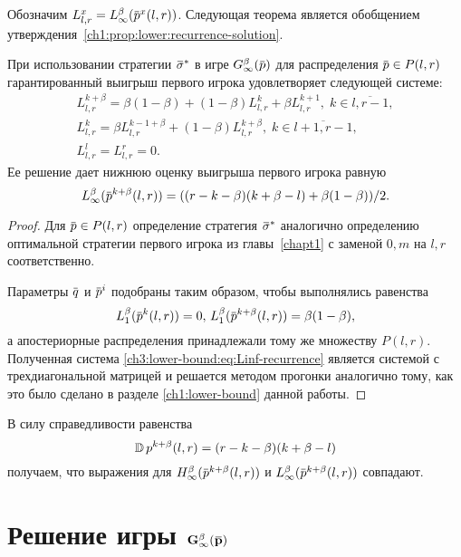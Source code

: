 {Обозначим $L^x_{l,r} = \Low(\p^x(l,r))$.
Следующая теорема является обобщением утверждения~\ref{ch1:prop:lower:recurrence-solution}.
\begin{theorem}
  \label{lower-bound:theorem}
  При использовании стратегии $\sigmav^*$ в игре $\theG[\infty](\p)$ для распределения $\p \in P(l,r)$ гарантированный выигрыш первого игрока удовлетворяет следующей системе:
  \begin{equation}
    \label{ch3:lower-bound:eq:Linf-recurrence}
    \begin{gathered}
      L^{k+\beta}_{l,r} =
      \beta(1-\beta) + (1-\beta) L^k_{l,r} + \beta L^{k+1}_{l,r}, \;
      k \in \overline{l, r - 1}, \\
      L^k_{l,r} =
      \beta L^{k-1+\beta}_{l,r} + (1-\beta) L^{k+\beta}_{l,r}, \;
      k \in \overline{l + 1, r - 1},\\
      L^l_{l,r} = L^r_{l,r} = 0.
    \end{gathered}
  \end{equation}
  Ее решение дает нижнюю оценку выигрыша первого игрока равную
  \begin{equation*}
    \Low(\p^{k+\beta}(l, r)) = ((r-k-\beta)(k+\beta-l) + \beta(1-\beta))/2.
  \end{equation*}
\end{theorem}
\begin{proof}
  Для $\p \in P(l,r)$ определение стратегия $\sigmav^*$ аналогично определению оптимальной стратегии первого игрока из главы~\ref{chapt1} с заменой $0, m$ на $l, r$ соответственно.

  Параметры $\q$ и $\p^i$ подобраны таким образом, чтобы выполнялись равенства
  \[
    \Low[1](\p^k(l,r)) = 0, \, \Low[1](\p^{k+\beta}(l,r)) = \beta(1-\beta),
  \]
  а апостериорные распределения принадлежали тому же множеству $P(l,r)$.
  Полученная система \eqref{ch3:lower-bound:eq:Linf-recurrence} является системой с трехдиагональной матрицей и решается методом прогонки аналогично тому, как это было сделано в разделе \ref{ch1:lower-bound} данной работы.
\end{proof}

В силу справедливости равенства
\[
  \operatorname{\mathbb{D}} p^{k+\beta}(l, r) = (r-k-\beta)(k+\beta-l)
\]
получаем, что выражения для $\High(\p^{k+\beta}(l,r))$ и $\Low(\p^{k+\beta}(l,r))$ совпадают.

\section{Решение игры $\mathbf{G^\beta_\infty(\p)}$}
\label{ch3:sec:game-solution}

}
